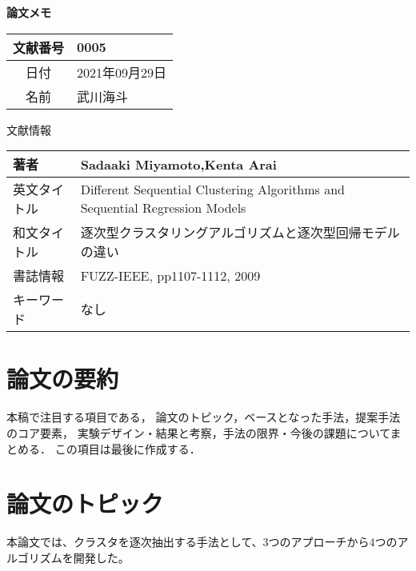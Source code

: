 \documentclass[10pt,onecolumn]{jsarticle}
\begin{document}
\vspace{-20mm}
\begin{center}
{\LARGE\textbf{論文メモ}}
\end{center}

\begin{flushright}
\begin{tabular}{|c|l|}
\hline
文献番号  &  0005
\\
\hline
日付  &  2021年09月29日
\\
\hline
名前  &  武川海斗
\\
\hline
\end{tabular}
\end{flushright}


%
%
\begin{center}
{\large 文献情報}
\begin{table}[hbp]%
\begin{tabular}{|l||l|}
\hline
著者  &  Sadaaki Miyamoto,Kenta Arai
\\ \hline
英文タイトル  & Different Sequential Clustering Algorithms and Sequential Regression Models
\\ \hline
和文タイトル  & 逐次型クラスタリングアルゴリズムと逐次型回帰モデルの違い
\\ \hline
書誌情報  &  FUZZ-IEEE, pp1107-1112, 2009
\\ \hline
キーワード & なし
\\ \hline
\end{tabular}
\end{table}
\end{center}

\section{論文の要約}
本稿で注目する項目である，
論文のトピック，ベースとなった手法，提案手法のコア要素，
実験デザイン・結果と考察，手法の限界・今後の課題についてまとめる．
この項目は最後に作成する．

\section{論文のトピック}
本論文では、クラスタを逐次抽出する手法として、3つのアプローチから4つのアルゴリズムを開発した。
\end{document}
